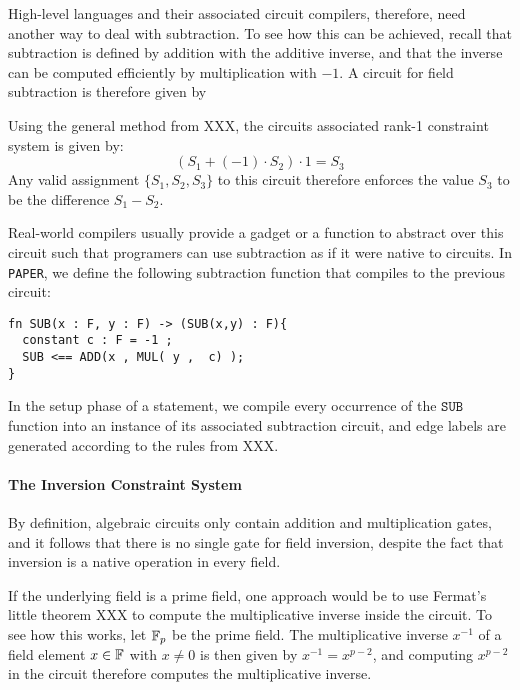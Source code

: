 High-level languages and their associated circuit compilers, therefore, need another way to deal with subtraction. To see how this can be achieved, recall that subtraction is defined by addition with the additive inverse, and that the inverse can be computed efficiently by multiplication with $-1$. A circuit for field subtraction is therefore given by
\begin{center}
\end{center}
Using the general method from XXX, the circuits associated rank-1 constraint system is given by:
\begin{equation}
\left(S_1 + (-1)\cdot S_2\right)\cdot 1 = S_3
\end{equation}
Any valid assignment $\{S_1,S_2, S_3\}$ to this circuit therefore enforces the value $S_3$ to be the difference $S_1- S_2$.

Real-world compilers usually provide a gadget or a function to abstract over this circuit such that programers can use subtraction as if it were native to circuits.
In \texttt{PAPER}, we define the following subtraction function that compiles to the previous circuit:
\begin{lstlisting}
fn SUB(x : F, y : F) -> (SUB(x,y) : F){
  constant c : F = -1 ;
  SUB <== ADD(x , MUL( y ,  c) );
}
\end{lstlisting}
In the setup phase of a statement, we compile every occurrence of the $\mathtt{SUB}$ function into an instance of its associated subtraction circuit, and edge labels are generated according to the rules from XXX.
\paragraph{The Inversion Constraint System} By definition, algebraic circuits only contain addition and multiplication gates, and it follows that there is no single gate for field inversion, despite the fact that inversion is a native operation in every field. 

If the underlying field is a prime field, one approach would be to use Fermat's little theorem XXX to compute the multiplicative inverse inside the circuit. To see how this works, let $\mathbb{F}_p$ be the prime field. The multiplicative inverse $x^{-1}$ of a field element $x\in\mathbb{F}$ with $x\neq 0$ is then given by $x^{-1}= x^{p-2}$, and computing $x^{p-2}$ in the circuit therefore computes the multiplicative inverse. 

